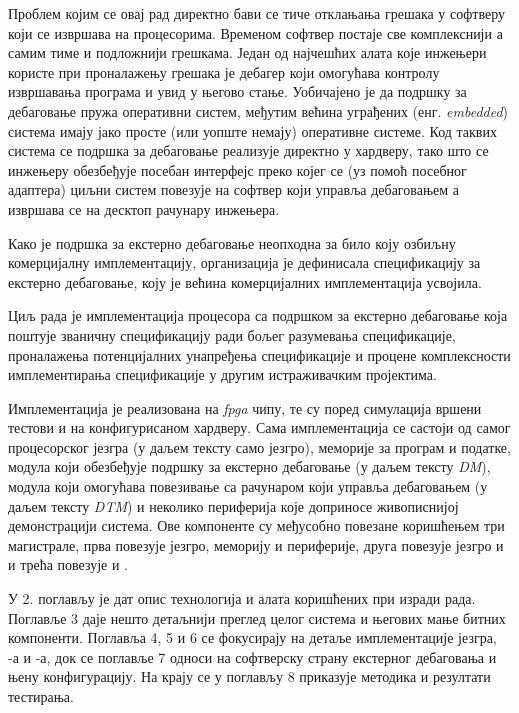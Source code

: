 Проблем којим се овај рад директно бави се тиче отклањања грешака у софтверу који се извршава на  процесорима.
Временом софтвер постаје све комплекснији а самим тиме и подложнији грешкама. 
Један од најчешћих алата које инжењери користе при проналажењу грешака је дебагер који омогућава контролу извршавања програма и увид у његово стање.
Уобичајено је да подршку за дебаговање пружа оперативни систем, међутим већина уграђених (енг. \textit{embedded}) система имају јако просте (или уопште немају) оперативне системе.
Код таквих система се подршка за дебаговање реализује директно у хардверу, тако што се инжењеру обезбеђује посебан интерфејс преко којег се (уз помоћ посебног адаптера) циљни систем повезује на софтвер који управља дебаговањем а извршава се на десктоп рачунару инжењера.

Како је подршка за екстерно дебаговање неопходна за било коју озбиљну комерцијалну имплементацију,  организација је дефинисала спецификацију\cite{debug_spec} за екстерно дебаговање, коју је већина комерцијалних имплементација усвојила.

Циљ рада је имплементација  процесора са подршком за екстерно дебаговање која поштује званичну спецификацију\cite{debug_spec} ради бољег разумевања спецификације, проналажења потенцијалних унапређења спецификације и процене комплексности имплементирања спецификације у другим истраживачким пројектима.

Имплементација је реализована на \textit{\acrfull{fpga}} чипу, те су поред симулација вршени тестови и на конфигурисаном хардверу.
Сама имплементација се састоји од самог  процесорског језгра (у даљем тексту само језгро), меморије за програм и податке, модула који обезбеђује подршку за екстерно дебаговање (у даљем тексту \textit{\acrfull{DM}}), модула који омогућава повезивање са рачунаром који управља дебаговањем (у даљем тексту \textit{\acrfull{DTM}}) и неколико периферија које доприносе живописнијој демонстрацији система. Ове компоненте су међусобно повезане коришћењем три магистрале, прва повезује језгро, меморију и периферије, друга повезује језгро и  и трећа повезује  и .

У 2. поглављу је дат опис технологија и алата коришћених при изради рада.
Поглавље 3 даје нешто детаљнији преглед целог система и његових мање битних компоненти.
Поглавља 4, 5 и 6 се фокусирају на детаље имплементације језгра, -а и -а, док се поглавље 7 односи на софтверску страну екстерног дебаговања и њену конфигурацију.
На крају се у поглављу 8 приказује методика и резултати тестирања.
